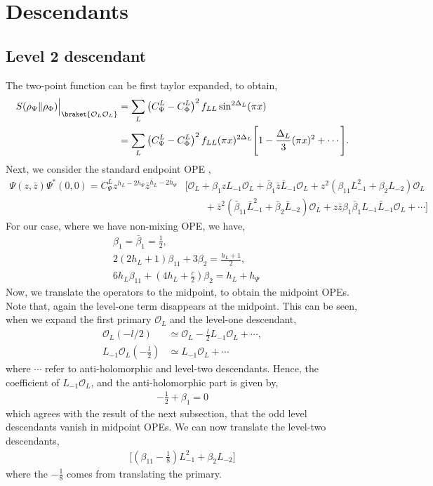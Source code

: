 \documentclass[11pt]{article}
\newcommand{\mO}{\mathcal{O}}
\newcommand{\nn}{\nonumber}
\newcommand{\lb}{\left(}
\newcommand{\rb}{\right)}
\begin{document}
\section{Descendants}\label{Descendant contribution to Relative entropy}
\subsection{Level 2 descendant}
The two-point function can be first taylor expanded, to obtain,
\begin{align}
    S(\rho_\Psi \|\rho_\Phi)\Big|_{\braket{\mO_L\mO_L}} &= \sum_L\lb C_\Psi^L - C_\Phi^L\rb^2f_{LL}\sin^{2\Delta_L}(\pi x) \\
    &= \sum_L\lb C_\Psi^L - C_\Phi^L\rb^2f_{LL}(\pi x)^{2\Delta_L} \Bigg[1 - \frac{\Delta_L}{3}(\pi x)^2 + \cdots \Bigg].
\end{align}
Next, we consider the standard endpoint OPE \cite{yellowbook},
\begin{align}
    \Psi(z,\bar z)  \Psi ^*(0,0) = C_{\Psi}^L z^{h_L - 2h_\Psi}\bar z ^{\bar h_L - 2\bar h_{\Psi}} &\Bigg[ \mO_L + \beta_1 zL_{-1} \mO_L + \bar \beta_1 \bar z \bar L_{-1}\mO_L + z^2 \lb \beta_{11}L_{-1}^2+ \beta_2L_{-2}\rb \mO_L  \nn \\&\qquad + \bar z ^2 \lb \bar \beta_{11}\bar L_{-1}^2 + \bar\beta_2\bar L_{-2}\rb\mO_L + z\bar z \beta_1 \bar \beta_1 L_{-1} \bar L_{-1}\mO_L + \cdots \Bigg]
\end{align}
For our case, where we have non-mixing OPE, we have,
\begin{align}
    &\beta_1 = \bar \beta_1 = \frac{1}{2},\\
    &2(2h_L + 1)\beta_{11} + 3\beta_2 = \frac{h_L+1}{2},\\
    &6h_L \beta_{11}+ \lb 4h_L + \frac{c}{2}\rb \beta_2 = h_L+ h_\Psi 
\end{align}
Now, we translate the operators to the midpoint, to obtain the midpoint OPEs.
Note that, again the level-one term disappears at the midpoint. This can be seen, when we expand the first primary $\mO_L$ and the level-one descendant,
\begin{align}
    \mO_L\lb - l/2 \rb &\simeq \mO_L - \frac{l}{2}L_{-1}\mO_L + \cdots ,\\
    L_{-1}\mO_L\lb-\frac{l}{2}\rb &\simeq L_{-1}\mO_L + \cdots
\end{align}
where $\cdots$ refer to anti-holomorphic and level-two descendants. Hence, the coefficient of $L_{-1}\mO_L$, and the anti-holomorphic part is given by,
\begin{align}
    -\frac{1}{2} + \beta_1 = 0
\end{align}
which agrees with the result of the next subsection, that the odd level descendants vanish in midpoint OPEs.
We can now translate the level-two descendants,
\begin{align}
    \Bigg[ \lb\beta_{11} - \frac{1}{8}\rb L_{-1}^2 + \beta_2L_{-2} \Bigg]
\end{align}
where the $-\frac{1}{8}$ comes from translating the primary. 
\end{document}
